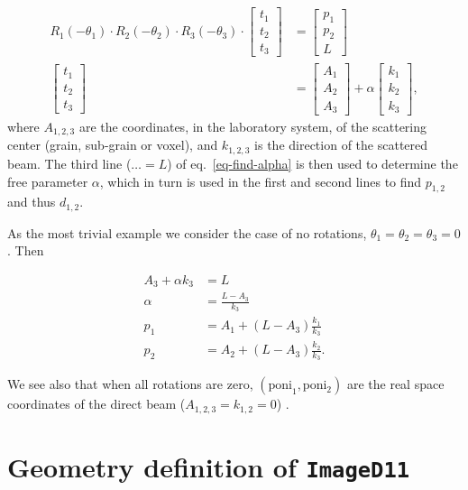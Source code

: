 \documentclass[12pt]{article}
\begin{document}
\begin{align}
  R_1(-\theta_1)\cdot R_2(-\theta_2) \cdot R_3(-\theta_3) \cdot
  \begin{bmatrix} t_1 \\ t_2 \\ t_3
  \end{bmatrix}
  & =
  \begin{bmatrix} p_1 \\ p_2 \\ L \end{bmatrix}
  \label{eq-find-alpha}
  \\
  \begin{bmatrix}
    t_1 \\ t_2 \\ t_3
  \end{bmatrix}
  & =
  \begin{bmatrix}
    A_1  \\ A_2 \\ A_3 
  \end{bmatrix}
  + \alpha
  \begin{bmatrix}
    k_1 \\ k_2 \\ k_3
  \end{bmatrix},
\end{align}
where $A_{1,2,3}$ are the coordinates, in the laboratory system, of
the scattering center (grain, sub-grain or voxel), and $k_{1,2,3}$ is
the direction of the scattered beam. The third line ($\ldots = L$) of
eq.~\ref{eq-find-alpha} is then used to determine the free parameter
$\alpha$, which in turn is used in the first and second lines to find
$p_{1,2}$ and thus $d_{1,2}$.

As the most trivial example we consider the case of no rotations,
$\theta_1 = \theta_2 = \theta_3 = 0$. Then

\begin{align}
  A_3 + \alpha k_3 & = L \\
  \alpha & = \frac{L-A_3}{k_3} \\
  p_1 & = A_1 + (L-A_3) \frac{k_1}{k_3} \\
  p_2 & = A_2 + (L-A_3) \frac{k_2}{k_3}.
\end{align}

We see also that when all rotations are zero, $(\mathrm{poni}_1,
\mathrm{poni_2})$ are the real space coordinates of the direct beam
($A_{1,2,3}=k_{1,2}=0$) .

\section{Geometry definition of \texttt{ImageD11}}
\end{document}
